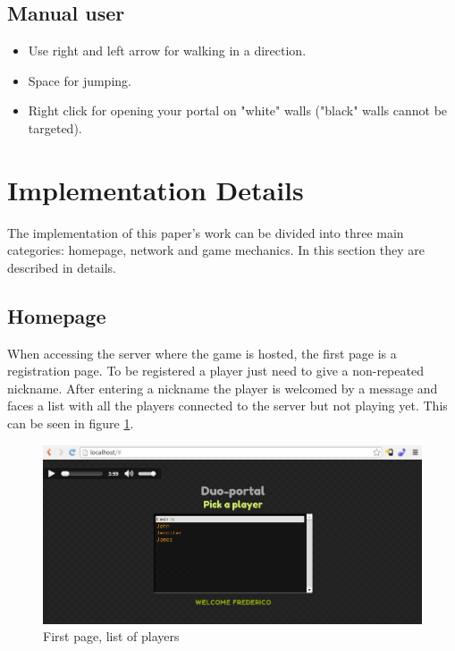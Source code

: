 \documentclass{chi-ext}
\begin{document}
\subsection{Manual user}
\begin{itemize}
\item Use right and left arrow for walking in a direction.
\item Space for jumping.
\item Right click for opening your portal on "white" walls ("black" walls cannot be targeted).
\end{itemize}

\section{Implementation Details}
The implementation of this paper's work can be divided into three main categories: homepage, network and game mechanics. In this section they are described in details.

\subsection{Homepage}
When accessing the server where the game is hosted, the first page is a registration page. To be registered a player just need to give a non-repeated nickname. After entering a nickname the player is welcomed by a message and faces a list with all the players connected to the server but not playing yet. This can be seen in figure \ref{fig:index}. 

\begin{figure}
\hspace*{-0.1\columnwidth}%
\parbox{1.4\columnwidth}{
  \centering
  \includegraphics[width=1.4\columnwidth]{index.png}
  \caption{First page, list of players}
  \label{fig:index}
}
\end{figure}
\end{document}
